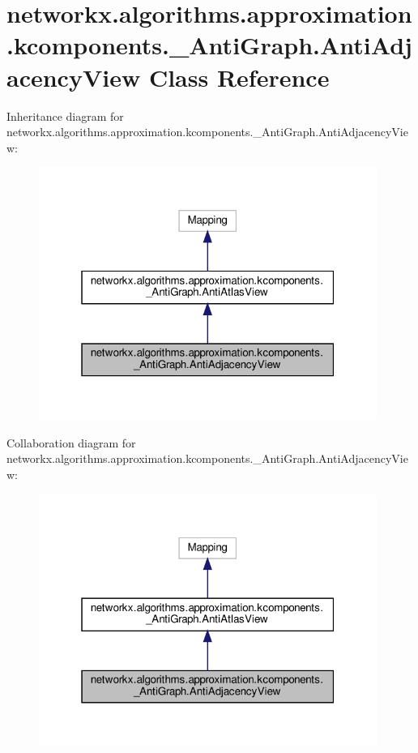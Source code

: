 \hypertarget{classnetworkx_1_1algorithms_1_1approximation_1_1kcomponents_1_1__AntiGraph_1_1AntiAdjacencyView}{}\section{networkx.\+algorithms.\+approximation.\+kcomponents.\+\_\+\+Anti\+Graph.\+Anti\+Adjacency\+View Class Reference}
\label{classnetworkx_1_1algorithms_1_1approximation_1_1kcomponents_1_1__AntiGraph_1_1AntiAdjacencyView}


Inheritance diagram for networkx.\+algorithms.\+approximation.\+kcomponents.\+\_\+\+Anti\+Graph.\+Anti\+Adjacency\+View\+:
\nopagebreak
\begin{figure}[H]
\begin{center}
\leavevmode
\includegraphics[width=313pt]{classnetworkx_1_1algorithms_1_1approximation_1_1kcomponents_1_1__AntiGraph_1_1AntiAdjacencyView__inherit__graph}
\end{center}
\end{figure}


Collaboration diagram for networkx.\+algorithms.\+approximation.\+kcomponents.\+\_\+\+Anti\+Graph.\+Anti\+Adjacency\+View\+:
\nopagebreak
\begin{figure}[H]
\begin{center}
\leavevmode
\includegraphics[width=313pt]{classnetworkx_1_1algorithms_1_1approximation_1_1kcomponents_1_1__AntiGraph_1_1AntiAdjacencyView__coll__graph}
\end{center}
\end{figure}

